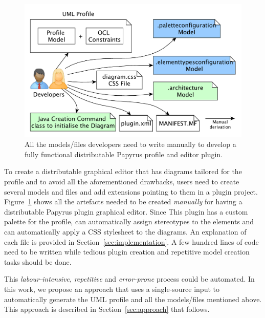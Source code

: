 \begin{figure}[t]
	\centering
	\includegraphics[width=1\textwidth]{diagrams/neededPapyrusFiles_new.pdf}
	\vspace{-3mm}
	\caption[]{All the models/files developers need to write manually to 
	develop a fully functional distributable Papyrus profile and editor plugin.}
	\label{fig:neededPapyrusFiles}
	\vspace*{-3mm}
\end{figure}

To create a distributable graphical editor that has diagrams tailored for the profile and to avoid all the aforementioned drawbacks, users need to create several models and files and add extensions pointing to them in a plugin project. 
Figure~\ref{fig:neededPapyrusFiles} shows all the artefacts needed to be created \textit{manually} for having a distributable Papyrus plugin graphical editor. Since 
This plugin has a custom palette for the profile, can automatically assign stereotypes to the elements and can automatically apply a CSS stylesheet to the diagrams.
An explanation of each file is provided in Section~\ref{sec:implementation}. 
A few hundred lines of code need to be written while tedious plugin creation and repetitive model creation tasks should be done. 


This \textit{labour-intensive}, \textit{repetitive} and \textit{error-prone} process could be automated. 
In this work, we propose an approach that uses a single-source input to automatically generate the UML profile and all the models/files mentioned above. 
This approach is described in Section~\ref{sec:approach} that follows. 
